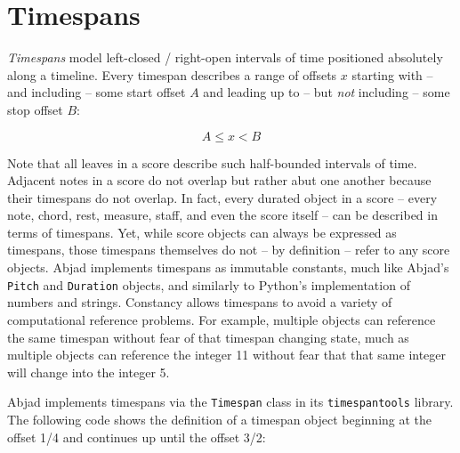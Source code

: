 \section{Timespans}
\label{sec:timespans}

\emph{Timespans} model left-closed / right-open intervals of time positioned
absolutely along a timeline. Every timespan describes a range
of offsets $x$ starting with -- and including -- some start offset $A$ and
leading up to -- but \emph{not} including -- some stop offset $B$:

\begin{equation}
A \leq x < B
\end{equation}

Note that all leaves in a score describe such half-bounded intervals of time.
Adjacent notes in a score do not overlap but rather abut one another because
their timespans do not overlap. In fact, every durated object in a score --
every note, chord, rest, measure, staff, and even the score itself -- can be
described in terms of timespans. Yet, while score objects can always be
expressed as timespans, those timespans themselves do not -- by definition
-- refer to any score objects. Abjad implements timespans as immutable
constants, much like Abjad's \texttt{Pitch} and \texttt{Duration} objects, and
similarly to Python's implementation of numbers and strings. Constancy allows
timespans to avoid a variety of computational reference problems. For example,
multiple objects can reference the same timespan without fear of that timespan
changing state, much as multiple objects can reference the integer 11 without
fear that that same integer will change into the integer 5.


Abjad implements timespans via the \texttt{Timespan} class in its
\texttt{timespantools} library. The following code shows the definition of a
timespan object beginning at the offset 1/4 and continues up until the offset
3/2:

\begin{comment}
<abjad>
timespan = timespantools.Timespan(
    start_offset=Offset(1, 4),
    stop_offset=Offset(3, 2),
    )
</abjad>
\end{comment}


